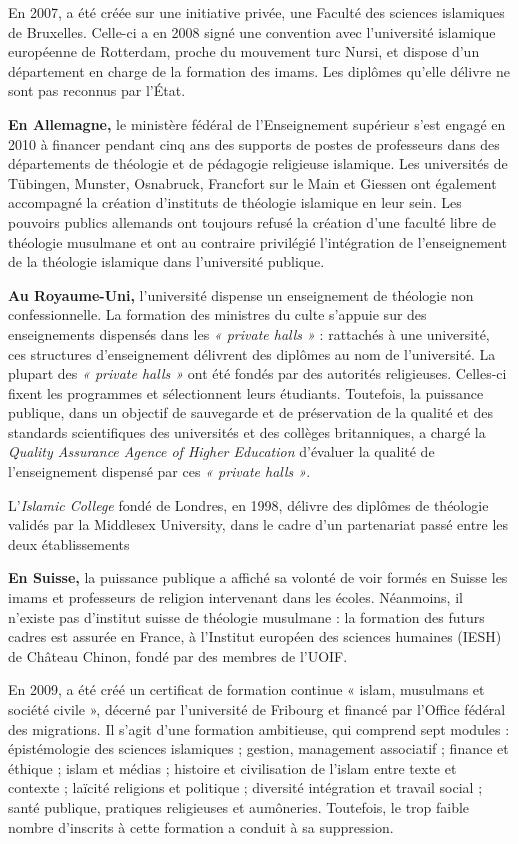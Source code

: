 En 2007, a été créée sur une initiative privée, une Faculté des sciences
islamiques de Bruxelles. Celle-ci a en 2008 signé une convention avec
l'université islamique européenne de Rotterdam, proche du mouvement turc
Nursi, et dispose d'un département en charge de la formation des imams.
Les diplômes qu'elle délivre ne sont pas reconnus par l'État.

\textbf{En Allemagne,} le ministère fédéral de l'Enseignement supérieur
s'est engagé en 2010 à financer pendant cinq ans des supports de postes
de professeurs dans des départements de théologie et de pédagogie
religieuse islamique. Les universités de Tübingen, Munster, Osnabruck,
Francfort sur le Main et Giessen ont également accompagné la création
d'instituts de théologie islamique en leur sein. Les pouvoirs publics
allemands ont toujours refusé la création d'une faculté libre de
théologie musulmane et ont au contraire privilégié l'intégration de
l'enseignement de la théologie islamique dans l'université publique.

\textbf{Au Royaume-Uni,} l'université dispense un enseignement de
théologie non confessionnelle. La formation des ministres du culte
s'appuie sur des enseignements dispensés dans les \emph{« private halls
»} : rattachés à une université, ces structures d'enseignement délivrent
des diplômes au nom de l'université. La plupart des \emph{« private
halls »} ont été fondés par des autorités religieuses.
Celles-ci fixent les programmes et sélectionnent leurs étudiants.
Toutefois, la puissance publique, dans un objectif de sauvegarde et de
préservation de la qualité et des standards scientifiques des
universités et des collèges britanniques, a chargé la \emph{Quality
Assurance Agence of Higher Education} d'évaluer la qualité de
l'enseignement dispensé par ces \emph{« private halls »}.

L'\emph{Islamic College} fondé de Londres, en 1998, délivre des diplômes
de théologie validés par la Middlesex University, dans le cadre d'un
partenariat passé entre les deux établissements

\textbf{En Suisse,} la puissance publique a affiché sa volonté de voir
formés en Suisse les imams et professeurs de religion intervenant dans
les écoles. Néanmoins, il n'existe pas d'institut suisse de théologie
musulmane : la formation des futurs cadres est assurée en France, à
l'Institut européen des sciences humaines (IESH) de Château Chinon,
fondé par des membres de l'UOIF.

En 2009, a été créé un certificat de formation continue « islam,
musulmans et société civile », décerné par l'université de Fribourg et
financé par l'Office fédéral des migrations. Il s'agit d'une formation
ambitieuse, qui comprend sept modules : épistémologie des sciences
islamiques ; gestion, management associatif ; finance et éthique ; islam
et médias ; histoire et civilisation de l'islam entre texte et contexte
; laïcité religions et politique ; diversité intégration et travail
social ; santé publique, pratiques religieuses et aumôneries. Toutefois,
le trop faible nombre d'inscrits à cette formation a conduit à sa
suppression.


